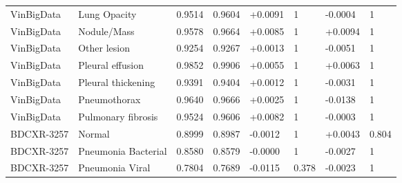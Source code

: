 \begin{tabular}{llllllll}
VinBigData & Lung Opacity & 0.9514 & 0.9604 & +0.0091 & 1 & -0.0004 & 1 \\
VinBigData & Nodule/Mass & 0.9578 & 0.9664 & +0.0085 & 1 & +0.0094 & 1 \\
VinBigData & Other lesion & 0.9254 & 0.9267 & +0.0013 & 1 & -0.0051 & 1 \\
VinBigData & Pleural effusion & 0.9852 & 0.9906 & +0.0055 & 1 & +0.0063 & 1 \\
VinBigData & Pleural thickening & 0.9391 & 0.9404 & +0.0012 & 1 & -0.0031 & 1 \\
VinBigData & Pneumothorax & 0.9640 & 0.9666 & +0.0025 & 1 & -0.0138 & 1 \\
VinBigData & Pulmonary fibrosis & 0.9524 & 0.9606 & +0.0082 & 1 & -0.0003 & 1 \\
BDCXR-3257 & Normal & 0.8999 & 0.8987 & -0.0012 & 1 & +0.0043 & 0.804 \\
BDCXR-3257 & Pneumonia Bacterial & 0.8580 & 0.8579 & -0.0000 & 1 & -0.0027 & 1 \\
BDCXR-3257 & Pneumonia Viral & 0.7804 & 0.7689 & -0.0115 & 0.378 & -0.0023 & 1 \\
\bottomrule
\end{tabular}
